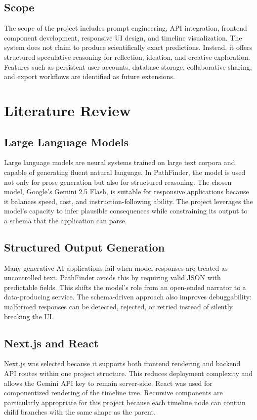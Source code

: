 \documentclass[12pt,a4paper]{report}
\begin{document}
\section{Scope}
The scope of the project includes prompt engineering, API integration, frontend component development, responsive UI design, and timeline visualization. The system does not claim to produce scientifically exact predictions. Instead, it offers structured speculative reasoning for reflection, ideation, and creative exploration. Features such as persistent user accounts, database storage, collaborative sharing, and export workflows are identified as future extensions.

\chapter{Literature Review}

\section{Large Language Models}
Large language models are neural systems trained on large text corpora and capable of generating fluent natural language. In PathFinder, the model is used not only for prose generation but also for structured reasoning. The chosen model, Google's Gemini 2.5 Flash, is suitable for responsive applications because it balances speed, cost, and instruction-following ability. The project leverages the model's capacity to infer plausible consequences while constraining its output to a schema that the application can parse.

\section{Structured Output Generation}
Many generative AI applications fail when model responses are treated as uncontrolled text. PathFinder avoids this by requiring valid JSON with predictable fields. This shifts the model's role from an open-ended narrator to a data-producing service. The schema-driven approach also improves debuggability: malformed responses can be detected, rejected, or retried instead of silently breaking the UI.

\section{Next.js and React}
Next.js was selected because it supports both frontend rendering and backend API routes within one project structure. This reduces deployment complexity and allows the Gemini API key to remain server-side. React was used for componentized rendering of the timeline tree. Recursive components are particularly appropriate for this project because each timeline node can contain child branches with the same shape as the parent.
\end{document}
